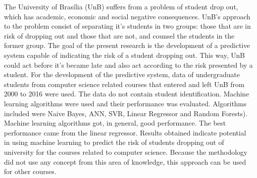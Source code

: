 The University of Brasília (UnB) suffers from a problem of student drop out, which has
academic, economic and social negative consequences. UnB's approach to the problem
consist of separating it's students in two groups: those that are in risk of dropping
out and those that are not, and counsel the students in the former group. 
The goal of the present research is the development of a predictive system
capable of indicating the risk of a student dropping out. This way,
UnB could act before it's became late and also act according to the risk presented by a
student. 
For the development of the predictive system, data of undergraduate students from
computer science related courses that entered and left UnB from 2000 to 2016 were
used. The data do not contain student identification. Machine learning algorithms were
used and their performance was evaluated. Algorithms included were Naive Bayes, ANN,
SVR, Linear Regressor and Random Forests).
Machine learning algorithms got, in general, good performance. The best performance came
from the linear regressor. Results obtained indicate potential in using machine
learning to predict the risk of students dropping out of university for the courses
related to computer science. Because the methodology did not use any concept from
this area of knowledge, this approach can be used for other courses. 
